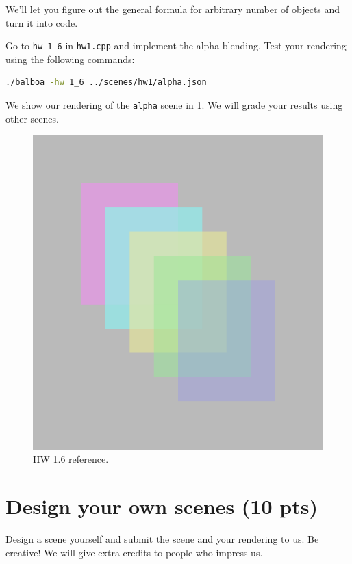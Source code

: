We'll let you figure out the general formula for arbitrary number of objects and turn it into code.

Go to \lstinline{hw_1_6} in \lstinline{hw1.cpp} and implement the alpha blending. Test your rendering using the following commands:
\begin{lstlisting}[language=bash]
  ./balboa -hw 1_6 ../scenes/hw1/alpha.json
\end{lstlisting}

We show our rendering of the \lstinline{alpha} scene in \cref{fig:hw1_6}. We will grade your results using other scenes.

\begin{figure}[ht]
    \centering
    \includegraphics[width=0.5\linewidth]{imgs/hw_1_6.png}
    \caption{HW 1.6 reference.}
    \label{fig:hw1_6}
\end{figure}

\section{Design your own scenes (10 pts)}

Design a scene yourself and submit the scene and your rendering to us. Be creative! We will give extra credits to people who impress us.

%
%


